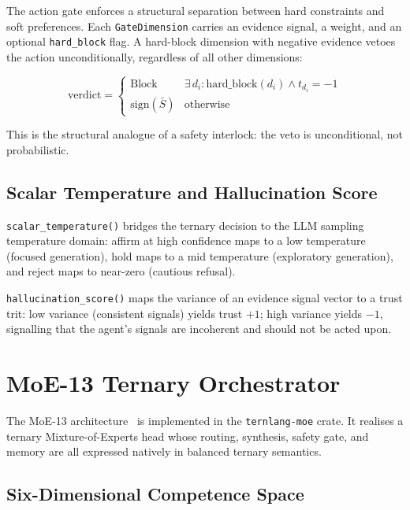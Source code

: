 \documentclass[journal,10pt,twocolumn]{IEEEtran}
\begin{document}
The action gate enforces a structural separation between hard constraints
and soft preferences. Each \texttt{GateDimension} carries an evidence
signal, a weight, and an optional \texttt{hard\_block} flag. A hard-block
dimension with negative evidence vetoes the action unconditionally,
regardless of all other dimensions:

\begin{equation}
  \text{verdict} = \begin{cases}
    \text{Block} & \exists\, d_i : \text{hard\_block}(d_i) \wedge t_{d_i} = -1 \\
    \text{sign}(\bar{S}) & \text{otherwise}
  \end{cases}
  \label{eq:gate}
\end{equation}

This is the structural analogue of a safety interlock: the veto is
unconditional, not probabilistic.

\subsection{Scalar Temperature and Hallucination Score}

\texttt{scalar\_temperature()} bridges the ternary decision to the LLM
sampling temperature domain: affirm at high confidence maps to a low
temperature (focused generation), hold maps to a mid temperature
(exploratory generation), and reject maps to near-zero (cautious refusal).

\texttt{hallucination\_score()} maps the variance of an evidence signal
vector to a trust trit: low variance (consistent signals) yields trust $+1$;
high variance yields $-1$, signalling that the agent's signals are
incoherent and should not be acted upon.

\section{MoE-13 Ternary Orchestrator}
\label{sec:moe}

The MoE-13 architecture~\cite{moe13_2026} is implemented in the
\texttt{ternlang-moe} crate. It realises a ternary Mixture-of-Experts head
whose routing, synthesis, safety gate, and memory are all expressed natively
in balanced ternary semantics.

\subsection{Six-Dimensional Competence Space}
\end{document}
